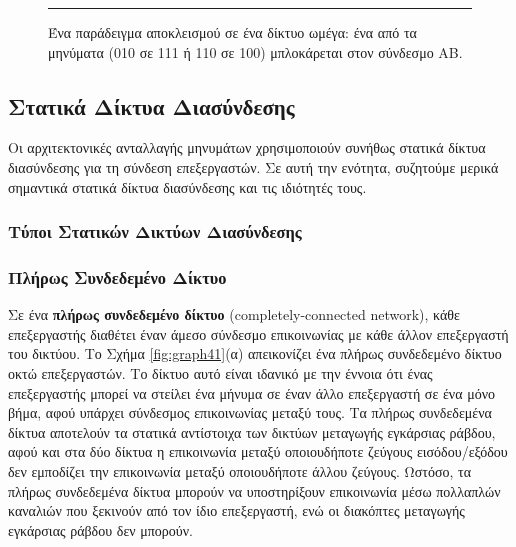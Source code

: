 \documentclass[12pt,a4paper]{article} %
\begin{document}
\begin{figure}[H]
\noindent\rule{\textwidth}{0.2pt}
\caption{Ένα παράδειγμα αποκλεισμού σε ένα δίκτυο ωμέγα: ένα από τα μηνύματα
(010 σε 111 ή 110 σε 100) μπλοκάρεται στον σύνδεσμο ΑΒ.}
\label{fig:graph40}
\end{figure}
\vspace{0.3cm}

\subsection{Στατικά Δίκτυα Διασύνδεσης}
Οι αρχιτεκτονικές ανταλλαγής μηνυμάτων χρησιμοποιούν συνήθως στατικά 
δίκτυα διασύνδεσης για τη σύνδεση επεξεργαστών. Σε αυτή την ενότητα, 
συζητούμε μερικά σημαντικά στατικά δίκτυα διασύνδεσης και τις ιδιότητές τους.

\subsubsection{Τύποι Στατικών Δικτύων Διασύνδεσης}
\subsubsection*{Πλήρως Συνδεδεμένο Δίκτυο}
Σε ένα \textbf{πλήρως συνδεδεμένο δίκτυο} (completely-connected network), 
κάθε επεξεργαστής διαθέτει έναν άμεσο σύνδεσμο επικοινωνίας με κάθε άλλον 
επεξεργαστή του δικτύου. Το Σχήμα \ref{fig:graph41}(α) απεικονίζει ένα 
πλήρως συνδεδεμένο δίκτυο οκτώ επεξεργαστών. Το δίκτυο αυτό είναι ιδανικό 
με την έννοια ότι ένας επεξεργαστής μπορεί να στείλει ένα μήνυμα σε έναν 
άλλο επεξεργαστή σε ένα μόνο βήμα, αφού υπάρχει σύνδεσμος επικοινωνίας 
μεταξύ τους. Τα πλήρως συνδεδεμένα δίκτυα αποτελούν τα στατικά αντίστοιχα 
των δικτύων μεταγωγής εγκάρσιας ράβδου, αφού και στα δύο δίκτυα η 
επικοινωνία μεταξύ οποιουδήποτε ζεύγους εισόδου/εξόδου δεν εμποδίζει την 
επικοινωνία μεταξύ οποιουδήποτε άλλου ζεύγους. Ωστόσο, τα 
πλήρως συνδεδεμένα δίκτυα μπορούν να υποστηρίξουν επικοινωνία μέσω 
πολλαπλών καναλιών που ξεκινούν από τον ίδιο επεξεργαστή, ενώ οι 
διακόπτες μεταγωγής εγκάρσιας ράβδου δεν μπορούν.
\end{document}

